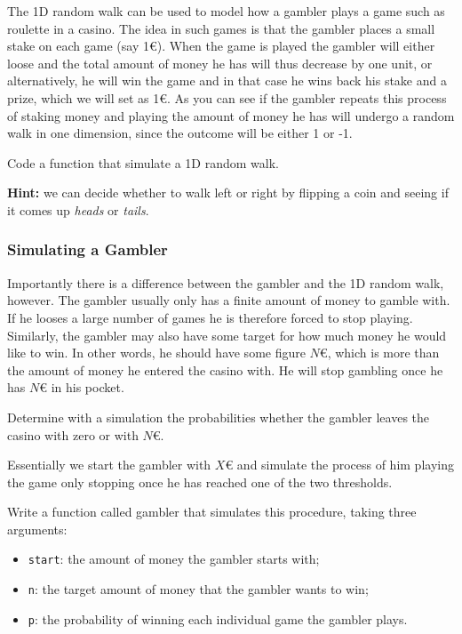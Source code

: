 \documentclass[12pt,a4paper]{article}
\begin{document}
The 1D random walk can be used to model how a gambler plays a game such as roulette in a casino. The idea in such games is that the gambler places a small stake on each game (say 1€). When the game is played the gambler will either loose and the total amount of money he has will thus decrease by one unit, or alternatively, he will win the game and in that case he wins back his stake and a prize, which we will set as 1€. As you can see if the gambler repeats this process of staking money and playing the amount of money he has will undergo a random walk in one dimension, since the outcome will be either 1 or -1.

\begin{question}
Code a function that simulate a 1D random walk. 

\noindent
\textbf{Hint:} we can decide whether to walk left or right by flipping a coin and seeing if it comes up \emph{heads} or \emph{tails}.
\end{question}

\subsubsection{Simulating a Gambler}

Importantly there is a difference between the gambler and the 1D random walk, however. The gambler usually only has a finite amount of money to gamble with. If he looses a large number of games he is therefore forced to stop playing. Similarly, the gambler may also have some target for how much money he would like to win. In other words, he should have some figure $N$€, which is more than the amount of money he entered the casino with. He will stop gambling once he has $N$€ in his pocket.

\begin{question}
Determine with a simulation the probabilities whether the gambler leaves the casino with zero or with $N$€.

Essentially we start the gambler with $X$€ and simulate the process of him playing the game only stopping once he has reached one of the two thresholds.

Write a function called gambler that simulates this procedure, taking three arguments:
\begin{itemize}
\item \texttt{start}: the amount of money the gambler starts with; \item \texttt{n}: the target amount of money that the gambler wants to win;
\item \texttt{p}: the probability of winning each individual game the gambler plays.
\end{itemize}
\end{question}
\end{document}
